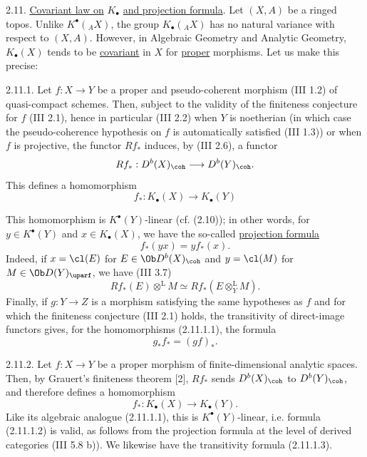 2.11. \uline{Covariant law on} \(K_{\bullet}\) \uline{and projection formula}. Let \((X,A)\) be a ringed topos. Unlike \(K^{\bullet}({}_A X)\), the group \(K_\bullet({}_A X)\) has no natural variance with respect to \((X,A)\). However, in Algebraic Geometry and Analytic Geometry, \(K_{\bullet}(X)\) tends to be \uline{covariant} in \(X\) for \uline{proper} morphisms. Let us make this precise:

2.11.1. Let \(f:X\to Y\) be a proper and pseudo-coherent morphism (III 1.2) of quasi-compact schemes. Then, subject to the validity of the finiteness conjecture for \(f\) (III 2.1), hence in particular (III 2.2) when \(Y\) is noetherian (in which case the pseudo-coherence hypothesis on \(f\) is automatically satisfied (III 1.3)) or when \(f\) is projective, the functor \(Rf_*\) induces, by (III 2.6), a functor
\[
 Rf_*:D^b(X)_{\coh}\longrightarrow D^b(Y)_{\coh}.
\]
This defines a homomorphism
\begin{equation}\tag{2.11.1.1}
 f_*:K_{\bullet}(X)\longrightarrow K_{\bullet}(Y)
\end{equation}

%
This homomorphism is \(K^{\bullet}(Y)\)-linear (cf. (2.10)); in other words, for \(y\in K^{\bullet}(Y)\) and \(x\in K_{\bullet}(X)\), we have the so-called \uline{projection formula}
\begin{equation}\tag{2.11.1.2}
 f_*(yx)=y f_*(x).
\end{equation}
Indeed, if \(x=\cl(E)\) for \(E\in\Ob D^b(X)_{\coh}\) and \(y=\cl(M)\) for \(M\in\Ob D(Y)_{\uparf}\), we have (III 3.7)
\[
 Rf_*(E)\otimes^{\mathrm L}M\simeq
 Rf_*(E\otimes_Y^{\mathrm L}M).
\]
Finally, if \(g:Y\to Z\) is a morphism satisfying the same hypotheses as \(f\) and for which the finiteness conjecture (III 2.1) holds, the transitivity of direct-image functors gives, for the homomorphisms (2.11.1.1), the formula
\begin{equation}\tag{2.11.1.3}
 g_*f_*=(gf)_*.
\end{equation}

2.11.2. Let \(f:X\to Y\) be a proper morphism of finite-dimensional analytic spaces. Then, by Grauert's finiteness theorem [2], \(Rf_*\) sends \(D^b(X)_{\coh}\) to \(D^b(Y)_{\coh}\), and therefore defines a homomorphism
\begin{equation}\tag{2.11.2.1}
 f_*:K_{\bullet}(X)\longrightarrow K_{\bullet}(Y).
\end{equation}
Like its algebraic analogue (2.11.1.1), this is \(K^{\bullet}(Y)\)-linear, i.e. formula (2.11.1.2) is valid, as follows from the projection formula at the level of derived categories (III 5.8 b)). We likewise have the transitivity formula (2.11.1.3).

